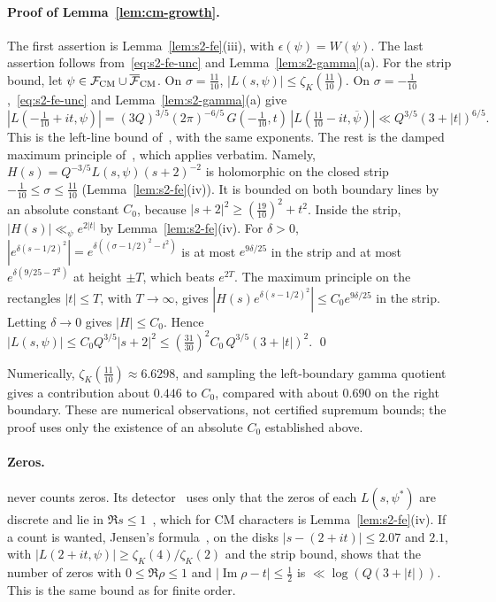 \documentclass[11pt]{article}
\numberwithin{equation}{section}
\begin{document}
\paragraph{Proof of Lemma~\ref{lem:cm-growth}.} The first assertion is Lemma~\ref{lem:s2-fe}(iii), with
$\epsilon(\psi)=W(\psi)$. The last assertion follows from~\eqref{eq:s2-fe-unc} and Lemma~\ref{lem:s2-gamma}(a). For
the strip bound, let $\psi\in\mathcal F_{\rm CM}\cup\overline{\mathcal F}_{\rm CM}$. On $\sigma=\frac{11}{10}$,
$|L(s,\psi)|\le\zeta_K(\frac{11}{10})$. On $\sigma=-\frac1{10}$,~\eqref{eq:s2-fe-unc} and
Lemma~\ref{lem:s2-gamma}(a) give
\begin{equation}\label{eq:d157}
 |L(-\tfrac1{10}+it,\psi)|=(3Q)^{3/5}(2\pi)^{-6/5}\,G(-\tfrac1{10},t)\,|L(\tfrac{11}{10}-it,\overline\psi)|
 \ll Q^{3/5}(3+|t|)^{6/5}.
\end{equation}
This is the left-line bound of~\cite[proof of Lemma~4.8]{OAI78}, with the same exponents. The rest is the damped
maximum principle of~\cite[proof of Lemma~4.8]{OAI78}, which applies verbatim. Namely,
$H(s)=Q^{-3/5}L(s,\psi)(s+2)^{-2}$ is holomorphic on the closed strip $-\frac1{10}\le\sigma\le\frac{11}{10}$
(Lemma~\ref{lem:s2-fe}(iv)). It is bounded on both boundary lines by an absolute constant $C_0$, because
$|s+2|^2\ge(\frac{19}{10})^2+t^2$. Inside the strip, $|H(s)|\ll_\psi e^{2|t|}$ by Lemma~\ref{lem:s2-fe}(iv). For
$\delta>0$, $|e^{\delta(s-1/2)^2}|=e^{\delta((\sigma-1/2)^2-t^2)}$ is at most $e^{9\delta/25}$ in the strip and
at most $e^{\delta(9/25-T^2)}$ at height $\pm T$, which beats $e^{2T}$. The maximum principle on the rectangles
$|t|\le T$, with $T\to\infty$, gives $|H(s)e^{\delta(s-1/2)^2}|\le C_0e^{9\delta/25}$ in the strip. Letting
$\delta\to0$ gives $|H|\le C_0$. Hence $|L(s,\psi)|\le C_0Q^{3/5}|s+2|^2\le(\frac{31}{30})^2C_0\,Q^{3/5}(3+|t|)^2$.
\qed

Numerically, $\zeta_K(\frac{11}{10})\approx6.6298$, and sampling the left-boundary
gamma quotient gives a contribution about $0.446$ to $C_0$, compared with about
$0.690$ on the right boundary. These are numerical observations, not certified
supremum bounds; the proof uses only the existence of an absolute $C_0$ established above.

\paragraph{Zeros.} \cite{OAI78} never counts zeros. Its detector~\cite[Lemma~8.1]{OAI78} uses only
that the zeros of each $L(s,\psi^*)$ are discrete and lie in $\Re s\le1$~\cite[proof of Lemma~8.1]{OAI78}, which for CM
characters is Lemma~\ref{lem:s2-fe}(iv). If a count is wanted, Jensen's formula~\cite{Jen99}, \cite[\S3.61]{Tit39} on the disks
$|s-(2+it)|\le2.07$ and $2.1$, with $|L(2+it,\psi)|\ge\zeta_K(4)/\zeta_K(2)$ and the strip bound, shows that the
number of zeros with $0\le\Re\rho\le1$ and $|\operatorname{Im}\rho-t|\le\frac12$ is $\ll\log(Q(3+|t|))$. This is the
same bound as for finite order.
\end{document}
